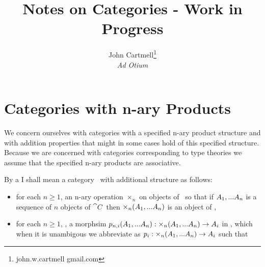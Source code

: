 \documentclass[10pt,a4paper]{scrartcl}
\title{Notes on Categories - Work in Progress}
\author{John Cartmell\footnote{john.w.cartmell gmail.com}\\ \normalsize{\textit{Ad Otium}}}
\begin{document}
\newcommand{\catc}{\cat{C}}
\newcommand{\catcw}{\cat{C}\ }

\section{Categories with n-ary Products} 
We concern ourselves with categories with a specified n-ary product structure and 
 with addition properties that might in some cases hold of this specified structure.  
Because we are concerned with categories corresponding to type theories we assume that the specified n-ary products are associative.
\begin{definition}
By a  I shall mean a category \catcw with additional structure as follows:
\begin{itemize}
\item for each $n \geq 1$, an n-ary operation $\times_n$ on objects of \catcw so that if $A_1,...A_n$ is a sequence of $n$ objects of $\catcw$ then $\times_n(A_1,...A_n)$ is an object of \catc,
\item for each $n \geq 1$, \foreachi, a morphsim $p_{n,i}(A_1,...A_n):\times_n(A_1,...A_n) \rightarrow A_i$ in \catc, which when it is unambigous we abbreviate as $p_i: \times_n(A_1,...A_n) \rightarrow A_i$
 such that


\end{itemize}
\end{definition}
\end{document}
